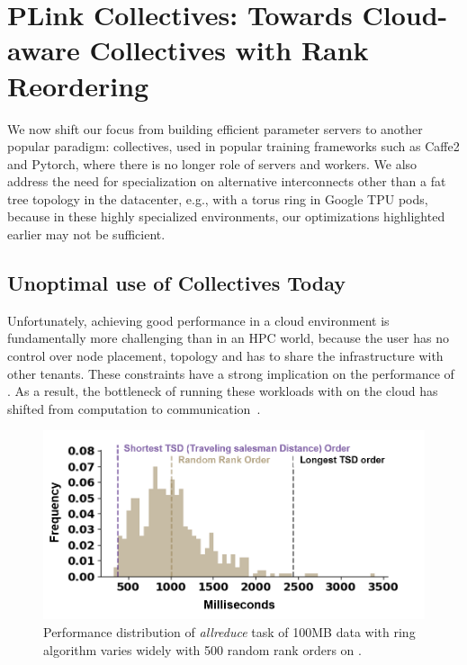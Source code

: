 \chapter{PLink Collectives: Towards Cloud-aware Collectives with Rank Reordering}
\label{sec:cc}
We now shift our focus from building efficient parameter servers to another popular paradigm: collectives, used in popular training frameworks such as Caffe2 and Pytorch, where there is no longer role of servers and workers. We also address the need for specialization on alternative interconnects other than a fat tree topology in the datacenter, e.g., with a torus ring in Google TPU pods, because in these highly specialized environments, our optimizations highlighted earlier may not be sufficient. 


\section{Unoptimal use of Collectives Today}
Unfortunately, achieving good \mpi performance in a cloud environment is fundamentally more challenging than in an HPC world, because the user has no control over node placement, topology and has to share the infrastructure with other tenants. These constraints have a strong implication on the performance of \mpi. As a result, the bottleneck of running these workloads with \mpi on the cloud has shifted from computation to communication~\cite{7092922}.

%

\begin{figure}[ht]
    \centering
    \includegraphics[width=.7\linewidth, trim=8 3 14 10,clip]{Figures/azringperformance.png}
    \caption{Performance distribution of \textit{allreduce} task of 100MB data with ring algorithm varies widely with 500 random rank orders on \azure.}
    \label{fig:azringperformance}
\end{figure}


